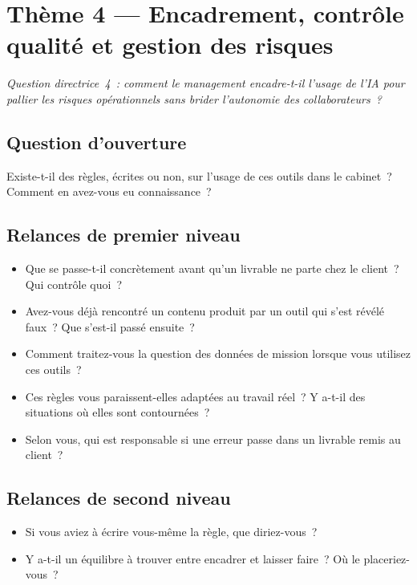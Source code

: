 \section{Thème 4 --- Encadrement, contrôle qualité et gestion des risques}

\textit{Question directrice~4~: comment le management encadre-t-il l'usage de l'IA
pour pallier les risques opérationnels sans brider l'autonomie des collaborateurs~?}

\subsection*{Question d'ouverture}

Existe-t-il des règles, écrites ou non, sur l'usage de ces outils dans le cabinet~?
Comment en avez-vous eu connaissance~?

\subsection*{Relances de premier niveau}

\begin{itemize}
    \item Que se passe-t-il concrètement avant qu'un livrable ne parte chez le client~?
    Qui contrôle quoi~?
    \item Avez-vous déjà rencontré un contenu produit par un outil qui s'est révélé
    faux~? Que s'est-il passé ensuite~?
    \item Comment traitez-vous la question des données de mission lorsque vous
    utilisez ces outils~?
    \item Ces règles vous paraissent-elles adaptées au travail réel~? Y a-t-il des
    situations où elles sont contournées~?
    \item Selon vous, qui est responsable si une erreur passe dans un livrable remis
    au client~?
\end{itemize}

\subsection*{Relances de second niveau}

\begin{itemize}
    \item Si vous aviez à écrire vous-même la règle, que diriez-vous~?
    \item Y a-t-il un équilibre à trouver entre encadrer et laisser faire~? Où le
    placeriez-vous~?
\end{itemize}

